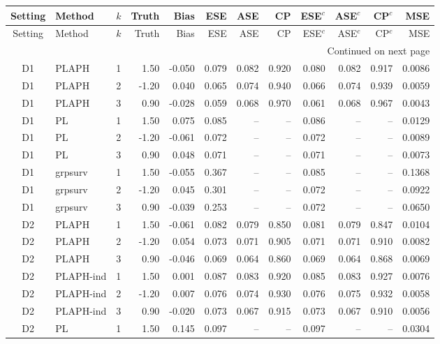 \begin{longtable}{cllrrrrrrrrr}

\label{tab:e10-linear-failure}\\
\toprule
Setting & Method & $k$ & Truth & Bias & ESE & ASE & CP & ESE$^{c}$ & ASE$^{c}$ & CP$^{c}$ & MSE \\
\midrule
\endfirsthead
\toprule
Setting & Method & $k$ & Truth & Bias & ESE & ASE & CP & ESE$^{c}$ & ASE$^{c}$ & CP$^{c}$ & MSE \\
\midrule
\endhead
\midrule
\multicolumn{12}{r}{Continued on next page} \\
\endfoot
\bottomrule
\endlastfoot
D1 & PLAPH & 1 & 1.50 & -0.050 & 0.079 & 0.082 & 0.920 & 0.080 & 0.082 & 0.917 & 0.0086 \\
D1 & PLAPH & 2 & -1.20 & 0.040 & 0.065 & 0.074 & 0.940 & 0.066 & 0.074 & 0.939 & 0.0059 \\
D1 & PLAPH & 3 & 0.90 & -0.028 & 0.059 & 0.068 & 0.970 & 0.061 & 0.068 & 0.967 & 0.0043 \\
D1 & PL & 1 & 1.50 & 0.075 & 0.085 & -- & -- & 0.086 & -- & -- & 0.0129 \\
D1 & PL & 2 & -1.20 & -0.061 & 0.072 & -- & -- & 0.072 & -- & -- & 0.0089 \\
D1 & PL & 3 & 0.90 & 0.048 & 0.071 & -- & -- & 0.071 & -- & -- & 0.0073 \\
D1 & grpsurv & 1 & 1.50 & -0.055 & 0.367 & -- & -- & 0.085 & -- & -- & 0.1368 \\
D1 & grpsurv & 2 & -1.20 & 0.045 & 0.301 & -- & -- & 0.072 & -- & -- & 0.0922 \\
D1 & grpsurv & 3 & 0.90 & -0.039 & 0.253 & -- & -- & 0.072 & -- & -- & 0.0650 \\
D2 & PLAPH & 1 & 1.50 & -0.061 & 0.082 & 0.079 & 0.850 & 0.081 & 0.079 & 0.847 & 0.0104 \\
D2 & PLAPH & 2 & -1.20 & 0.054 & 0.073 & 0.071 & 0.905 & 0.071 & 0.071 & 0.910 & 0.0082 \\
D2 & PLAPH & 3 & 0.90 & -0.046 & 0.069 & 0.064 & 0.860 & 0.069 & 0.064 & 0.868 & 0.0069 \\
D2 & PLAPH-ind & 1 & 1.50 & 0.001 & 0.087 & 0.083 & 0.920 & 0.085 & 0.083 & 0.927 & 0.0076 \\
D2 & PLAPH-ind & 2 & -1.20 & 0.007 & 0.076 & 0.074 & 0.930 & 0.076 & 0.075 & 0.932 & 0.0058 \\
D2 & PLAPH-ind & 3 & 0.90 & -0.020 & 0.073 & 0.067 & 0.915 & 0.073 & 0.067 & 0.910 & 0.0056 \\
D2 & PL & 1 & 1.50 & 0.145 & 0.097 & -- & -- & 0.097 & -- & -- & 0.0304 \\

\end{longtable}
